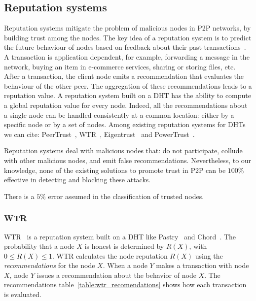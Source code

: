 \subsection{Reputation systems}
\label{sec:reputation_systems}
Reputation systems mitigate the problem of malicious nodes in
P2P networks, by building trust among the nodes. The key
idea of a reputation system is to predict the future behaviour
of nodes based on feedback about their past
transactions~\cite{Resnick:2000:RS:355112.355122}. A
transaction is application dependent, for example, forwarding a
message in the network, buying an item in e-commerce services,
sharing or storing files, etc. After a transaction, the client node emits
a recommendation that evaluates the behaviour of the other peer.
The aggregation of these recommendations leads to a reputation
value.
A reputation system built on a DHT has the ability
to compute a global reputation value for every node. Indeed,
all the recommendations about a single node can be handled
consistently at a common location: either by a specific node
or by a set of nodes. Among existing reputation systems for
DHTs we can cite: PeerTrust~\cite{xiong2004peertrust}, WTR~\cite{bonnaire2009wtr},
Eigentrust~\cite{kamvar2003eigentrust} and
PowerTrust~\cite{rahbar2007powertrust}.

Reputation systems deal with malicious nodes that:
do not participate, collude with other malicious nodes, and
emit false recommendations. Nevertheless, to our knowledge,
none of the existing solutions to promote trust in P2P can be
$100\%$ effective in detecting and blocking these attacks.

There is a $5\%$ error assumed in the classification of trusted nodes.

\subsubsection{WTR}
\label{sec:wtr}
WTR~\cite{bonnaire2009wtr} is a reputation system built on a DHT like Pastry~\cite{pastry} and
Chord~\cite{chord}. The probability that a node $X$ is honest is determined by
$R(X)$, with $0 \leq R(X) \leq 1$. WTR calculates the node reputation $R(X)$
using the \textit{recommendations} for the node $X$. When a node $Y$ makes a transaction with
node $X$, node $Y$ issues a recommendation about the behavior of node
$X$. The recommendations table~\ref{table:wtr_recomendations} shows how each
transaction is evaluated.
 
